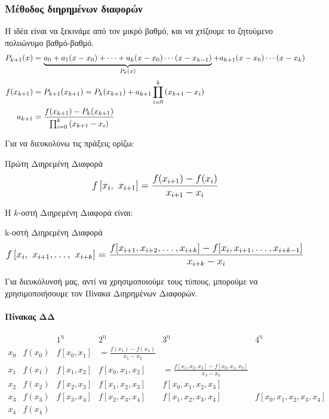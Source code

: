 \documentclass[11pt,a4paper,notitlepage,fleqn,draft]{article}
\begin{document}
 	\subsubsection{Μέθοδος διηρημένων διαφορών}
 	Η ιδέα είναι να ξεκινάμε από τον μικρό βαθμό, και να χτίζουμε το
 	ζητούμενο πολυώνυμο βαθμό-βαθμό.
 	\begin{align*}
 	P_{k+1}(x) &=
 	\underbrace{a_0+a_1(x-x_0)+\dots+a_k(x-x_0)\cdots(x-x_{k-1})}_{%
 		P_k(x)} + a_{k+1} (x-x_0)\cdots(x-x_k) \\[.4ex]
 	f(x_{k+1}) &= P_{k+1}(x_{k+1})
 	= P_k(x_{k+1}) + a_{k+1}\prod_{i=0}^{k} \left(x_{k+1}-x_i\right) \\
 	a_{k+1} &= \frac{f(x_{k+1}) - P_k(x_{k+1})}{
 		\prod_{i=0}^{k} \left(x_{k+1}-x_i\right)
 		}
 	\end{align*}
 	
 	Για να διευκολύνω τις πράξεις ορίζω:
 	\begin{defn}{Πρώτη Διηρεμένη Διαφορά}{}
 		\[
 		\mathlarger{
 		f\left[x_i,\ x_{i+1}\right] =
 		\frac{f(x_{i+1})-f(x_i)}{x_{i+1}-x_i}
 	    }
 		\]
 	\end{defn}
 	
 	Η \( k \)-οστή Διηρεμένη Διαφορά είναι:
 	\begin{defn}{k-οστή Διηρεμένη Διαφορά}{}
 		\[
 		\mathlarger{
 			f\left[x_i,\ x_{i+1}, \dots,\ x_{i+k}\right] =
 			\frac{
 				f[x_{i+1},x_{i+2},\dots,x_{i+k}]
 				- f[x_i,x_{i+1},\dots,x_{i+k-1}]
 				}{x_{i+k}-x_i}
 		}
 		\]
 	\end{defn}
 	
 	Για διευκόλυνσή μας, αντί να χρησιμοποιούμε τους τύπους, μπορούμε
 	να χρησιμοποιήσουμε τον Πίνακα Διηρημένων Διαφορών.
 	
 	\paragraph{Πίνακας ΔΔ}
 	\[
 	\begin{array}{llllll}
 	 & & 1^{\text{η}} & 2^\text{η} & 3^\text{η} & 4^\text{η}\\
 	x_0 & f(x_0) & f[x_0,x_1] & = \frac{f(x_1)-f(x_2)}{x_1-x_2} & \\
 	x_1 & f(x_1) & f[x_1,x_2] & f[x_0,x_1,x_2] & =
 	\frac{f[x_1,x_2,x_3]-f[x_0,x_1,x_2]}{x_3-x_0} \\
 	x_2 & f(x_2) & f[x_2,x_3] & f[x_1,x_2,x_3] & f[x_0,x_1,x_2,x_3]\\
 	x_3 & f(x_3) & f[x_3,x_4] & f[x_2,x_3,x_4] & f[x_1,x_2,x_3,x_4]
 	& f[x_0,x_1,x_2,x_3,x_4]
 	\\
 	x_4 & f(x_4) & &
 	\end{array}
 	\]
 	
\end{document}
